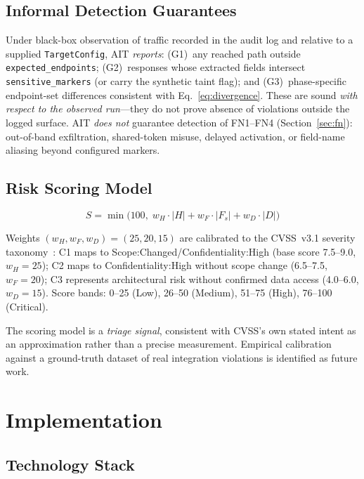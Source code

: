\documentclass[conference]{IEEEtran}
\begin{document}
\subsection{Informal Detection Guarantees}

Under black-box observation of traffic recorded in the audit log and
relative to a supplied \texttt{TargetConfig}, AIT \emph{reports}:
(G1)~any reached path outside \texttt{expected\_endpoints};
(G2)~responses whose extracted fields intersect \texttt{sensitive\_markers}
(or carry the synthetic taint flag); and
(G3)~phase-specific endpoint-set differences consistent with
Eq.~\eqref{eq:divergence}. These are sound \emph{with respect to the
observed run}---they do not prove absence of violations outside the
logged surface. AIT \emph{does not} guarantee detection of FN1--FN4
(Section~\ref{sec:fn}): out-of-band exfiltration, shared-token misuse,
delayed activation, or field-name aliasing beyond configured markers.

\subsection{Risk Scoring Model}

\begin{equation}
  S = \min\!\bigl(100,\;
        w_H \cdot |H| + w_F \cdot |F_s| + w_D \cdot |D|
      \bigr)
  \label{eq:risk}
\end{equation}

Weights $(w_H, w_F, w_D) = (25, 20, 15)$ are calibrated to the
CVSS~v3.1 severity taxonomy~\cite{cvss31}: C1 maps to
Scope:Changed/Confidentiality:High (base score 7.5--9.0, $w_H=25$);
C2 maps to Confidentiality:High without scope change (6.5--7.5,
$w_F=20$); C3 represents architectural risk without confirmed data
access (4.0--6.0, $w_D=15$). Score bands: 0--25 (Low), 26--50
(Medium), 51--75 (High), 76--100 (Critical).

The scoring model is a \emph{triage signal}, consistent with CVSS's
own stated intent as an approximation rather than a precise
measurement. Empirical calibration against a ground-truth dataset of
real integration violations is identified as future work.

\section{Implementation}
\label{sec:impl}

\subsection{Technology Stack}
\end{document}
